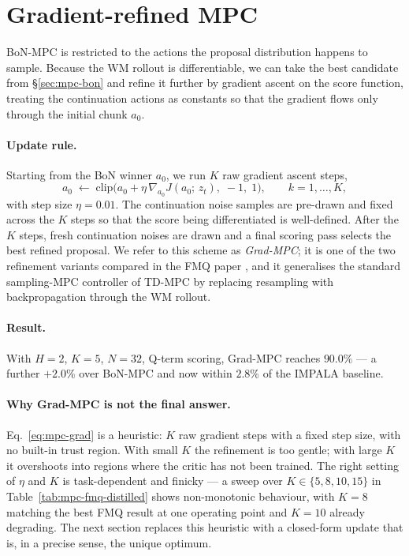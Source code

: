 \section{Gradient-refined MPC}
\label{sec:mpc-grad}

BoN-MPC is restricted to the actions the proposal distribution happens to sample. Because the WM rollout is differentiable, we can take the best candidate from \S\ref{sec:mpc-bon} and refine it further by gradient ascent on the score function, treating the continuation actions as constants so that the gradient flows only through the initial chunk $a_0$.

\paragraph{Update rule.} Starting from the BoN winner $a_0$, we run $K$ raw gradient ascent steps,
\begin{equation}
    a_0 \;\leftarrow\; \mathrm{clip}\!\Big(a_0 + \eta\,\nabla_{a_0} J(a_0;\,z_t),\;-1,\;1\Big),
    \qquad k = 1, \dots, K,
    \label{eq:mpc-grad}
\end{equation}
with step size $\eta = 0.01$. The continuation noise samples are pre-drawn and fixed across the $K$ steps so that the score being differentiated is well-defined. After the $K$ steps, fresh continuation noises are drawn and a final scoring pass selects the best refined proposal. We refer to this scheme as \emph{Grad-MPC}; it is one of the two refinement variants compared in the FMQ paper \cite{ziakas2026aligning}, and it generalises the standard sampling-MPC controller of TD-MPC \cite{hansen2022tdmpc, hansen2024tdmpc2} by replacing resampling with backpropagation through the WM rollout.

\paragraph{Result.} With $H = 2$, $K = 5$, $N = 32$, Q-term scoring, Grad-MPC reaches $90.0\%$ --- a further $+2.0\%$ over BoN-MPC and now within $2.8\%$ of the IMPALA baseline.

\paragraph{Why Grad-MPC is not the final answer.} Eq.~\eqref{eq:mpc-grad} is a heuristic: $K$ raw gradient steps with a fixed step size, with no built-in trust region. With small $K$ the refinement is too gentle; with large $K$ it overshoots into regions where the critic has not been trained. The right setting of $\eta$ and $K$ is task-dependent and finicky --- a sweep over $K \in \{5, 8, 10, 15\}$ in Table~\ref{tab:mpc-fmq-distilled} shows non-monotonic behaviour, with $K = 8$ matching the best FMQ result at one operating point and $K = 10$ already degrading. The next section replaces this heuristic with a closed-form update that is, in a precise sense, the unique optimum.

